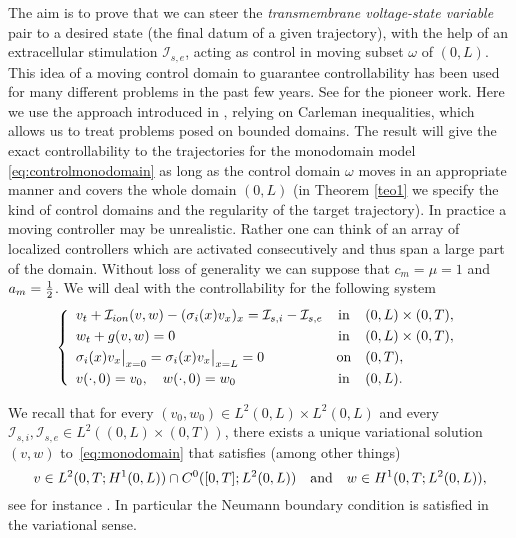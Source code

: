 \documentclass[10pt]{article}
\def\dis{\displaystyle}
\def\om{\omega}
\def\\Phivec{\mathbf{\Phi}}
\begin{document}
    The aim is to prove that we can steer the {\it transmembrane voltage-state variable} pair
 to a desired state (the final datum of a given trajectory),
    with the help of an extracellular stimulation $\mathcal{I}_{s,e}$, acting as control in moving subset $\om$ of $(0,L)$.
      This idea of a moving control domain to guarantee controllability has been used for many different problems in the past few years. See \cite{martin_rosier_moving} for
    the pioneer work. Here we use the approach introduced in \cite{CSZR}, relying on Carleman inequalities, which allows
    us to treat problems posed on bounded domains.
    The result will give the exact controllability to the trajectories for the monodomain model \eqref{eq:controlmonodomain} as long as
    the control domain $\omega$ moves in an appropriate manner and covers the whole
    domain $(0,L)$ (in Theorem \ref{teo1} we specify the kind of control domains
    and the regularity of the target trajectory). In practice a moving controller may be unrealistic. Rather one can think of an array of localized controllers which are activated consecutively and thus span a large part of the domain. Without loss of generality we can suppose that $c_m=\mu=1$ and $a_m={1\over2}$.
    We will deal with the controllability for the following  system
\begin{equation}\label{eq:monoT}
    \left\{
        \begin{array}{lcl}
        v_t+\mathcal{I}_{ion}(v,w)
        -(\sigma_i(x) v_x)_x=\mathcal{I}_{s,i}-\mathcal{I}_{s,e} &\mbox{in}&(0,L) \times (0,T),    \\
        \noalign{\smallskip}\dis
        w_t   +g(v,w)= 0 &\mbox{in}&(0,L) \times (0,T),    \\
        \noalign{\smallskip}\dis
        \sigma_i(x)v_x\big|_{x=0}=\sigma_i(x)v_x\big|_{x=L} = 0 &\mbox{on}&(0,T),            \\
        \noalign{\smallskip}\dis
        v(\cdot,0) =v_0,\quad w(\cdot,0) =w_0 &\mbox{in}&(0,L).
        \end{array}
    \right.
\end{equation}


	We recall that for every $(v_0,w_0)\in L^2(0,L)\times L^2(0,L)$ and every
	$\mathcal{I}_{s,i},\mathcal{I}_{s,e}\in L^2((0,L)\times(0,T))$,
	there exists a unique variational solution $(v,w)$ to~\eqref{eq:monodomain} %
	that satisfies (among other things)
\[
		v\in L^2(0,T;H^1(0,L))\cap C^0([0,T];L^2(0,L))\quad \hbox{and}\quad w\in H^1(0,T;L^2(0,L)),
\]
	see for instance \cite[Theorem $30$]{BOURGAULT}. In particular the Neumann boundary condition is satisfied in the  variational sense.
\end{document}
